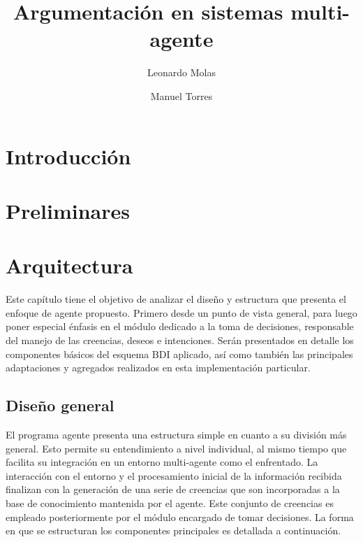 \documentclass[oneside]{book}
\title{Argumentación en sistemas multi-agente} %
\author{Leonardo Molas \and Manuel Torres}
\theoremstyle{definition}
\theoremstyle{example}
\begin{document}
\maketitle
\tableofcontents

\chapter*{Introducción}



\chapter{Preliminares} 








\chapter{Arquitectura} %

Este capítulo tiene el objetivo de analizar el diseño y estructura que presenta el 
enfoque de agente propuesto. Primero desde un punto de vista general, para luego 
poner especial énfasis en el módulo dedicado a la toma de decisiones, responsable 
del manejo de las creencias, deseos e intenciones. Serán presentados en detalle los 
componentes básicos del esquema BDI aplicado, así como también las principales 
adaptaciones y agregados realizados en esta implementación particular.

\section{Diseño general}


El programa agente presenta una estructura simple en cuanto a su división más general. 
Esto permite su entendimiento a nivel individual, al mismo tiempo que facilita su 
integración en un entorno multi-agente como el enfrentado. La interacción con el entorno 
y el procesamiento inicial de la información recibida finalizan con la generación de una 
serie de creencias que son incorporadas a la base de conocimiento mantenida por el agente. 
Este conjunto de creencias es empleado posteriormente por el módulo encargado de tomar 
decisiones. La forma en que se estructuran los componentes principales es detallada a 
continuación.
\end{document}
